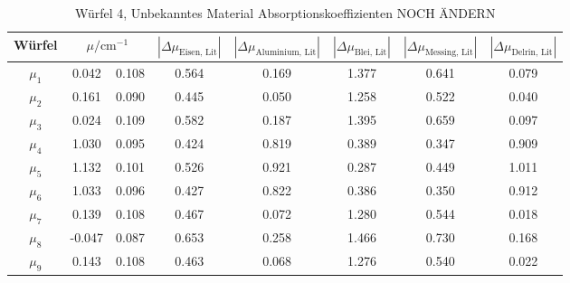 \FloatBarrier
\noindent
\FloatBarrier
\begin{table}[h]
    \centering
    \caption{Würfel 4, Unbekanntes Material Absorptionskoeffizienten NOCH ÄNDERN}
    \label{tab:W4_Abk}
    \begin{tabular}{c S[table-format=1.3]@{${}\pm{}$} S[table-format=1.3] S[table-format=1.3] S[table-format=1.3] S[table-format=1.3] S[table-format=1.3] S[table-format=1.3]}
        \toprule
        {Würfel} &  & {$|\Delta {\mu_\text{Eisen, Lit}}|$} & {$|\Delta {\mu_\text{Aluminium, Lit}}|$} & {$|\Delta {\mu_\text{Blei, Lit}}|$} & {$|\Delta {\mu_\text{Messing, Lit}}|$} & {$|\Delta {\mu_\text{Delrin, Lit}}|$} \\
        \midrule
        $\mu_1$ & 0.042  & 0.108 & 0.564 & 0.169 & 1.377 & 0.641 & 0.079 \\
        $\mu_2$ & 0.161  & 0.090 & 0.445 & 0.050 & 1.258 & 0.522 & 0.040 \\
        $\mu_3$ & 0.024  & 0.109 & 0.582 & 0.187 & 1.395 & 0.659 & 0.097 \\
        $\mu_4$ & 1.030  & 0.095 & 0.424 & 0.819 & 0.389 & 0.347 & 0.909 \\
        $\mu_5$ & 1.132  & 0.101 & 0.526 & 0.921 & 0.287 & 0.449 & 1.011 \\
        $\mu_6$ & 1.033  & 0.096 & 0.427 & 0.822 & 0.386 & 0.350 & 0.912 \\
        $\mu_7$ & 0.139  & 0.108 & 0.467 & 0.072 & 1.280 & 0.544 & 0.018 \\
        $\mu_8$ & -0.047 & 0.087 & 0.653 & 0.258 & 1.466 & 0.730 & 0.168 \\
        $\mu_9$ & 0.143  & 0.108 & 0.463 & 0.068 & 1.276 & 0.540 & 0.022 \\
        \bottomrule
    \end{tabular}
\end{table}
\FloatBarrier
\noindent
